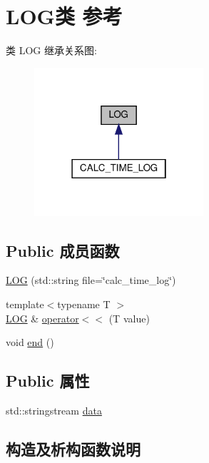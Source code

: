 \hypertarget{class_l_o_g}{}\section{L\+O\+G类 参考}
\label{class_l_o_g}


类 L\+OG 继承关系图\+:
\nopagebreak
\begin{figure}[H]
\begin{center}
\leavevmode
\includegraphics[width=178pt]{class_l_o_g__inherit__graph}
\end{center}
\end{figure}
\subsection*{Public 成员函数}
\begin{DoxyCompactItemize}
\item 
\hyperlink{class_l_o_g_a532a61e14c7064cde0e4b060eedf4611}{L\+OG} (std\+::string file=\char`\"{}calc\+\_\+time\+\_\+log\char`\"{})
\item 
{\footnotesize template$<$typename T $>$ }\\\hyperlink{class_l_o_g}{L\+OG} \& \hyperlink{class_l_o_g_afeed32550a98756294ce0fa0f0adaa30}{operator$<$$<$} (T value)
\item 
void \hyperlink{class_l_o_g_a015f6e62749fedaf5b5b6203e0ed66fd}{end} ()
\end{DoxyCompactItemize}
\subsection*{Public 属性}
\begin{DoxyCompactItemize}
\item 
std\+::stringstream \hyperlink{class_l_o_g_a18bb1b099fcf83954e9036a228c84f70}{data}
\end{DoxyCompactItemize}


\subsection{构造及析构函数说明}
\mbox{\label{class_l_o_g_a532a61e14c7064cde0e4b060eedf4611}} 
